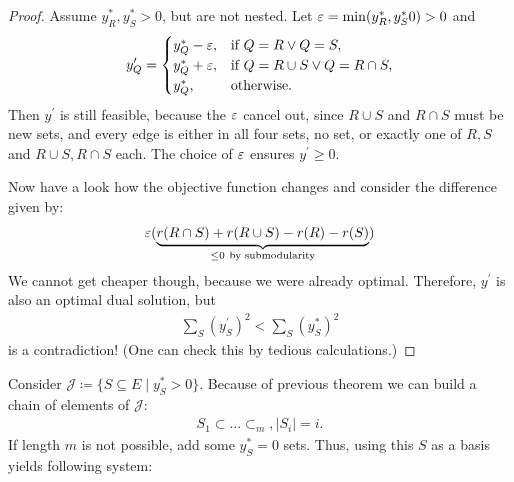 \begin{proof}
    Assume $y_R^*, y_S^* > 0$, but are not nested.
    Let $\varepsilon = \min(y_R^*,y_S^*0) >0$ and
    \begin{align*}
        y_Q^\prime = \begin{cases}
                         y_Q^*- \varepsilon, & \text{if } Q= R \vee Q=S,               \\
                         y_Q^*+ \varepsilon, & \text{if } Q= R \cup S \vee Q=R \cap S, \\
                         y_Q^*,       & \text{otherwise}.                      \\
                     \end{cases}
    \end{align*}
    Then $y^\prime$ is still feasible, because the $\varepsilon$ cancel out, since $R \cup S$ and $R \cap S$ must be new sets,
    and every edge is either in all four sets, no set, or exactly one of $R,S$ and $R\cup S,R\cap S$ each.
    The choice of $\varepsilon$ ensures $y^\prime \geq 0$.

    Now have a look how the objective function changes and consider the difference given by:
    \begin{align*}
        \varepsilon (\underbrace{r(R \cap S) + r(R \cup S) - r(R) - r(S)}_{\leq 0\ \text{by submodularity}})
    \end{align*}
    We cannot get cheaper though, because we were already optimal. Therefore,  $y^\prime$ is also an optimal dual solution, but
    \begin{align*}
        \sum_S(y_S^\prime)^2 < \sum_S(y^*_S)^2
    \end{align*}
    is a contradiction! (One can check this by tedious calculations.)
\end{proof}
Consider $\mathcal{J} \coloneqq \{S \subseteq E \mid y_S^* > 0\}$.
Because of previous theorem we can build a chain of elements of $\mathcal J$:
\begin{align*}
    S_1 \subset ... \subset_m, |S_i|=i.
\end{align*}
If length $m$ is not possible, add some $y^*_S=0$ sets.
Thus, using this $S$ as a basis yields following system:
